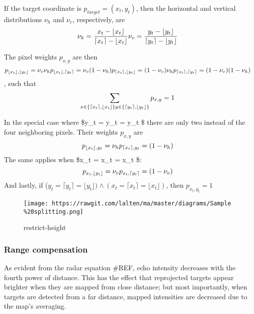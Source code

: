 If the target coordinate is \(p_{target}=(x_t, y_t)\), then the
horizontal and vertical distributions \(\nu_h\) and \(\nu_v\),
respectively, are \[
\nu_h = \frac{x_t - \lfloor x_t \rfloor}{\lceil x_t \rceil - \lfloor x_t \rfloor} \\
\nu_v = \frac{y_t - \lfloor y_t \rfloor}{\lceil y_t \rceil - \lfloor y_t \rfloor}
\]

The pixel weights \(p_{x,y}\) are then \[
p_{\lfloor x_t \rfloor, \lfloor y_t \rfloor} = \nu_v \nu_h\\
p_{\lfloor x_t \rfloor, \lceil y_t \rceil} = \nu_v (1 - \nu_h)\\
p_{\lceil x_t \rceil, \lfloor y_t \rfloor} =  (1 - \nu_v) \nu_h\\
p_{\lceil x_t \rceil, \lceil y_t \rceil} = (1 - \nu_v) (1 - \nu_h)
\] , such that \[
\sum\limits_{
x \in \{\lceil x_t \rceil, \lfloor x_t \rfloor\}\\
y \in \{\lceil y_t \rceil, \lfloor y_t \rfloor\}
} p_{x,y} = 1
\]

In the special case where \$y\_t = \lceil y\_t \rceil = \lfloor y\_t
\rfloor\$ there are only two instead of the four neighboring pixels.
Their weights \(p_{x,y}\) are \[
p_{\lfloor x_t \rfloor, y_t} = \nu_h\\
p_{\lceil x_t \rceil, y_t} = (1 - \nu_h)
\] The same applies when \$x\_t = \lceil x\_t \rceil = \lfloor x\_t
\rfloor\$: \[
p_{x_t, \lfloor y_t \rfloor} = \nu_v\\
p_{x_t, \lceil y_t \rceil} = (1 - \nu_v)
\] And lastly, if
(\(y_t = \lceil y_t \rceil = \lfloor y_t \rfloor ) \land (x_t = \lceil x_t \rceil = \lfloor x_t \rfloor )\),
then \(p_{x_t, y_t} = 1\)

\begin{figure}
\centering
\texttt{[image: https://rawgit.com/lalten/ma/master/diagrams/Sample\\\%20splitting.png]}
\caption{restrict-height}
\end{figure}

\subsubsection{Range compensation}\label{range-compensation}

As evident from the radar equation \#REF, echo intensity decreases with
the fourth power of distance. This has the effect that reprojected
targets appear brighter when they are mapped from close distance; but
most importantly, when targets are detected from a far distance, mapped
intensities are decreased due to the map's averaging.

